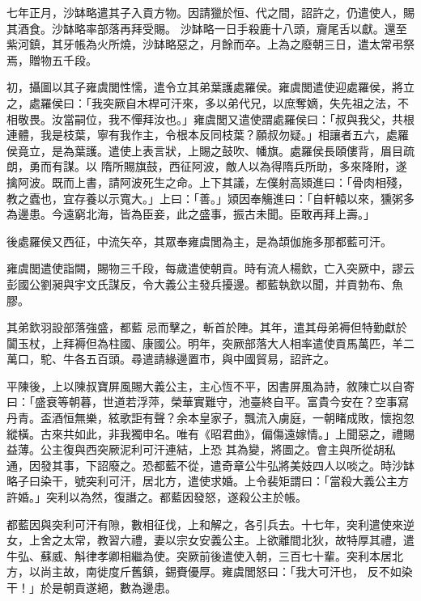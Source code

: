 \begin{pinyinscope}
 七年正月，沙缽略遣其子入貢方物。因請獵於恒、代之間，詔許之，仍遣使人，賜其酒食。沙缽略率部落再拜受賜。
 沙缽略一日手殺鹿十八頭，齎尾舌以獻。還至紫河鎮，其牙帳為火所燒，沙缽略惡之，月餘而卒。上為之廢朝三日，遣太常弔祭焉，贈物五千段。



 初，攝圖以其子雍虞閭性懦，遣令立其弟葉護處羅侯。雍虞閭遣使迎處羅侯，將立之，處羅侯曰：「我突厥自木桿可汗來，多以弟代兄，以庶奪嫡，失先祖之法，不相敬畏。汝當嗣位，我不憚拜汝也。」雍虞閭又遣使謂處羅侯曰：「叔與我父，共根連體，我是枝葉，寧有我作主，令根本反同枝葉？願叔勿疑。」相讓者五六，處羅侯竟立，是為葉護。遣使上表言狀，上賜之鼓吹、幡旗。處羅侯長頤僂背，眉目疏朗，勇而有謀。以
 隋所賜旗鼓，西征阿波，敵人以為得隋兵所助，多來降附，遂擒阿波。既而上書，請阿波死生之命。上下其議，左僕射高熲進曰：「骨肉相殘，教之蠹也，宜存養以示寬大。」上曰：「善。」熲因奉觴進曰：「自軒轅以來，獯粥多為邊患。今遠窮北海，皆為臣妾，此之盛事，振古未聞。臣敢再拜上壽。」



 後處羅侯又西征，中流矢卒，其眾奉雍虞閭為主，是為頡伽施多那都藍可汗。



 雍虞閭遣使詣闕，賜物三千段，每歲遣使朝貢。時有流人楊欽，亡入突厥中，謬云彭國公劉昶與宇文氏謀反，令大義公主發兵擾邊。都藍執欽以聞，并貢勃布、魚膠。



 其弟欽羽設部落強盛，都藍
 忌而擊之，斬首於陣。其年，遣其母弟褥但特勤獻於闐玉杖，上拜褥但為柱國、康國公。明年，突厥部落大人相率遣使貢馬萬匹，羊二萬口，駝、牛各五百頭。尋遣請緣邊置市，與中國貿易，詔許之。



 平陳後，上以陳叔寶屏風賜大義公主，主心恆不平，因書屏風為詩，敘陳亡以自寄曰：「盛衰等朝暮，世道若浮萍，榮華實難守，池臺終自平。富貴今安在？空事寫丹青。盃酒恒無樂，絃歌詎有聲？余本皇家子，飄流入虜庭，一朝睹成敗，懷抱忽縱橫。古來共如此，非我獨申名。唯有《昭君曲》，偏傷遠嫁情。」上聞惡之，禮賜益薄。公主復與西突厥泥利可汗連結，上恐
 其為變，將圖之。會主與所從胡私通，因發其事，下詔廢之。恐都藍不從，遣奇章公牛弘將美妓四人以啖之。時沙缽略子曰染干，號突利可汗，居北方，遣使求婚。上令裴矩謂曰：「當殺大義公主方許婚。」突利以為然，復譖之。都藍因發怒，遂殺公主於帳。



 都藍因與突利可汗有隙，數相征伐，上和解之，各引兵去。十七年，突利遣使來逆女，上舍之太常，教習六禮，妻以宗女安義公主。上欲離間北狄，故特厚其禮，遣牛弘、蘇威、斛律孝卿相繼為使。突厥前後遣使入朝，三百七十輩。突利本居北方，以尚主故，南徙度斤舊鎮，錫賚優厚。雍虞閭怒曰：「我大可汗也，
 反不如染干！」於是朝貢遂絕，數為邊患。




\end{pinyinscope}
